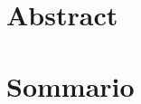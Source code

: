 
\begingroup
\let\clearpage\relax
\let\cleardoublepage\relax
\let\cleardoublepage\relax
{}
{}

\chapter*{Abstract}


\vfill
\newpage
{}
\chapter*{Sommario}
\begin{otherlanguage}{italian}


\end{otherlanguage}
\endgroup